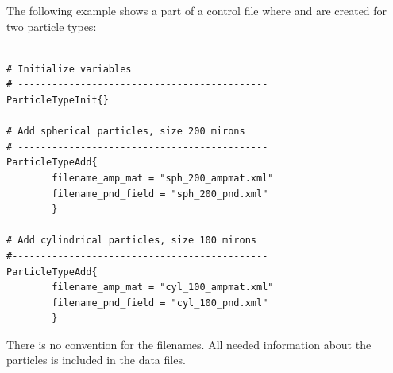 The following example shows a part of a control file where
 and  are created
for two particle types:

\begin{verbatim}

# Initialize variables
# --------------------------------------------
ParticleTypeInit{}

# Add spherical particles, size 200 mirons
# --------------------------------------------
ParticleTypeAdd{
        filename_amp_mat = "sph_200_ampmat.xml" 
        filename_pnd_field = "sph_200_pnd.xml"
        }       

# Add cylindrical particles, size 100 mirons
#---------------------------------------------
ParticleTypeAdd{
        filename_amp_mat = "cyl_100_ampmat.xml" 
        filename_pnd_field = "cyl_100_pnd.xml"
        }   

\end{verbatim}
 
There is no convention for the filenames. All needed information about
the particles is included in the data files.


\label{sec:scattering:rt_cloudbox}


